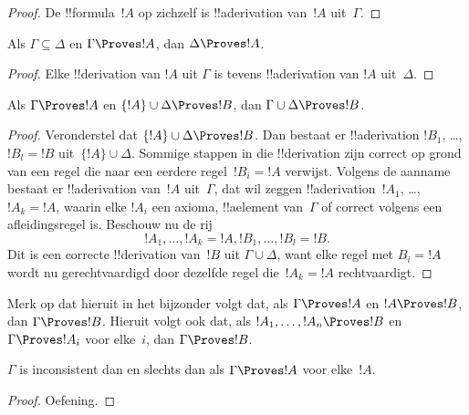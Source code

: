 \documentclass[openany]{memoir}
\begin{document}
\begin{proof}
  De !!{formula}~$!A$ op zichzelf is !!a{derivation} van~$!A$
  uit~$\Gamma$.
\end{proof}

\begin{prop}[Monotoniciteit]
Als $\Gamma \subseteq \Delta$ en $\Gamma \Proves !A$, dan $\Delta
\Proves !A$.
\end{prop}

\begin{proof}
Elke !!{derivation} van $!A$ uit $\Gamma$ is tevens !!a{derivation}
van $!A$ uit~$\Delta$.
\end{proof}

\begin{prop}[Transitiviteit]
Als $\Gamma \Proves !A$ en $\{!A\} \cup \Delta \Proves
!B$, dan $\Gamma \cup \Delta \Proves !B$.
\end{prop}

\begin{proof}
  Veronderstel dat $\{!A\} \cup \Delta \Proves !B$. Dan bestaat er
  !!a{derivation} $!B_1$, \dots, $!B_l = !B$ uit~$\{!A\} \cup
  \Delta$. Sommige stappen in die !!{derivation} zijn correct op
  grond van een regel die naar een eerdere regel~$!B_i = !A$
  verwijst. Volgens de aanname bestaat er !!a{derivation} van~$!A$
  uit~$\Gamma$, dat wil zeggen !!a{derivation}~$!A_1$, \dots,
  $!A_k = !A$, waarin elke $!A_i$ een axioma, !!a{element}
  van~$\Gamma$ of correct volgens een afleidingsregel is. Beschouw nu
  de rij
  \[
  !A_1, \dots, !A_k = !A, !B_1, \dots, !B_l = !B.
  \]
  Dit is een correcte !!{derivation} van~$!B$ uit $\Gamma \cup
  \Delta$, want elke regel met $B_i = !A$ wordt nu gerechtvaardigd
  door dezelfde regel die~$!A_k = !A$ rechtvaardigt.
\end{proof}

Merk op dat hieruit in het bijzonder volgt dat, als $\Gamma \Proves
!A$ en $!A \Proves !B$, dan $\Gamma \Proves !B$. Hieruit volgt ook
dat, als $!A_1, \dots, !A_n \Proves !B$ en $\Gamma \Proves !A_i$
voor elke~$i$, dan $\Gamma \Proves !B$.

\begin{prop}
$\Gamma$ is inconsistent dan en slechts dan als $\Gamma \Proves !A$
voor elke~$!A$.
\end{prop}

\begin{proof}
Oefening.
\end{proof}
\end{document}
